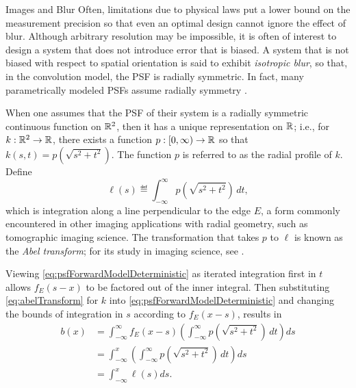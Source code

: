 \begin{chapter}{Images and Blur}
  Often, limitations due to physical laws put a lower bound on the measurement precision so that even an optimal design cannot ignore the effect of blur.
  Although arbitrary resolution may be impossible, it is often of interest to design a system that does not introduce error that is biased.
  A system that is not biased with respect to spatial orientation is said to exhibit \emph{isotropic blur}, so that, in the convolution model, the PSF is radially symmetric.
  In fact, many parametrically modeled PSFs assume radially symmetry \citep{doering1992,jain1989,kundur1996blind,watson1993}.  

  When one assumes that the PSF of their system is a radially symmetric continuous function on $\mathbb R^2$, then it has a unique representation on $\mathbb R$; i.e., for $k:\mathbb R^2 \to \mathbb R$, there exists a function $p:[0,\infty)\to \mathbb R$ so that $k(s,t) = p\left(\sqrt{s^2 + t^2}\right)$.  
  The function $p$ is referred to as the radial profile of $k$.
  Define
  \begin{equation} \label{eq:abelTransform}
    \ell(s) \eqdef \int_{-\infty}^\infty p\left(\sqrt{s^2 + t^2}\right)\,dt,
  \end{equation}
  which is integration along a line perpendicular to the edge $E$, a form commonly encountered in other imaging applications with radial geometry, such as tomographic imaging science.
  The transformation that takes $p$ to $\ell$ is known as the \emph{Abel transform}; for its study in imaging science, see \citep{bracewell,epstein2008,knill93}.

  Viewing \eqref{eq:psfForwardModelDeterministic} as iterated integration first in $t$ allows $f_E(s-x)$ to be factored out of the inner integral. 
  Then substituting \eqref{eq:abelTransform} for $k$ into  \eqref{eq:psfForwardModelDeterministic} and changing the bounds of integration in $s$ according to $f_E(x-s)$, results in 
  \begin{align}
    b(x) &= \int_{-\infty}^\infty f_E(x-s) \left(\int_{-\infty}^\infty p\left(\sqrt{s^2 + t^2}\right)\,dt\right)ds \nonumber \\
         &= \int_{-\infty}^x \left(\int_{-\infty}^\infty p\left(\sqrt{s^2 + t^2}\right)\,dt\right)ds \nonumber \\
         &= \int_{-\infty}^x \ell(s)ds. \label{eq:abelForward}
  \end{align}


\end{chapter}
